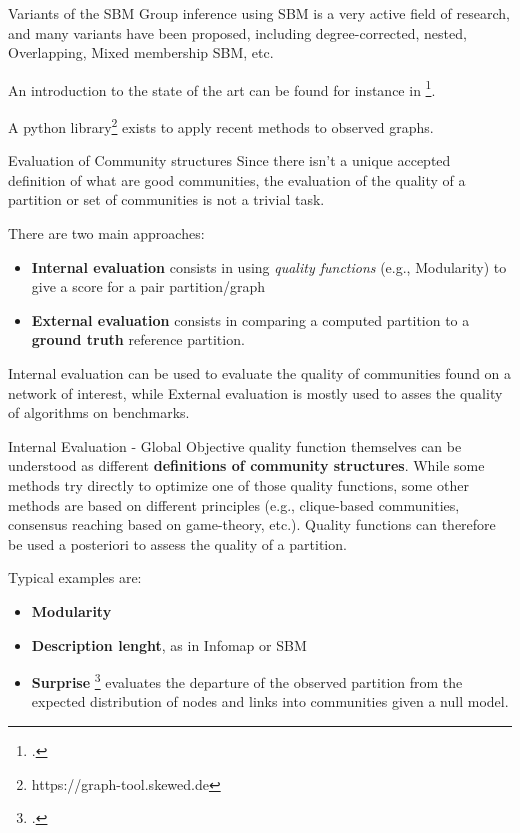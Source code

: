 \documentclass[a4paper,11pt]{book}
\begin{document}
\begin{textbox}{Variants of the SBM}
Group inference using SBM is a very active field of research, and many variants have been proposed, including degree-corrected, nested, Overlapping, Mixed membership SBM, etc.

An introduction to the state of the art can be found for instance in \footcite{lee2019review}.

A python library\footnote{https://graph-tool.skewed.de} exists to apply recent methods to observed graphs.
\end{textbox}



\begin{textbox}{Evaluation of Community structures}
Since there isn't a unique accepted definition of what are good communities, the evaluation of the quality of a partition or set of communities is not a trivial task. 

There are two main approaches:
\begin{itemize}
    \item \textbf{Internal evaluation} consists in using \textit{quality functions} (e.g., Modularity) to give a score for a pair partition/graph
    \item \textbf{External evaluation} consists in comparing a computed partition to a \textbf{ground truth} reference partition.
\end{itemize}

Internal evaluation can be used to evaluate the quality of communities found on a network of interest, while External evaluation is mostly used to asses the quality of algorithms on benchmarks. 
\end{textbox}

\begin{textbox}{Internal Evaluation - Global}
Objective quality function themselves can be understood as different \textbf{definitions of community structures}. While some methods try directly to optimize one of those quality functions, some other methods are based on different principles (e.g., clique-based communities, consensus reaching based on game-theory, etc.). Quality functions can therefore be used a posteriori to assess the quality of a partition.

Typical examples are:
\begin{itemize}
    \item \textbf{Modularity}
    \item \textbf{Description lenght}, as in Infomap or SBM
    \item \textbf{Surprise} \footcite{aldecoa2013surprise} evaluates the departure of the observed partition from the expected distribution of nodes and links into communities given a null model.
\end{itemize}

\end{textbox}
\end{document}
